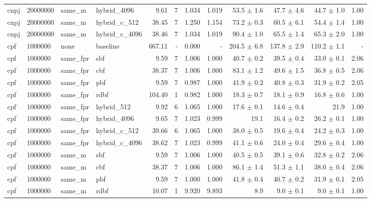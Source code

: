 \begin{tabular}{llllrrrrrrrr}
cnpj & 20000000 & same\_m & hybrid\_4096 & 9.61 & 7 & 1.034 & 1.019 & 53.5 $\pm$ 1.6 & 47.7 $\pm$ 4.6 & 44.7 $\pm$ 1.0 & 1.00 \\
cnpj & 20000000 & same\_m & hybrid\_c\_512 & 38.45 & 7 & 1.250 & 1.154 & 73.2 $\pm$ 0.3 & 60.5 $\pm$ 6.1 & 54.4 $\pm$ 1.4 & 1.00 \\
cnpj & 20000000 & same\_m & hybrid\_c\_4096 & 38.46 & 7 & 1.034 & 1.019 & 90.4 $\pm$ 1.0 & 65.5 $\pm$ 1.4 & 65.3 $\pm$ 2.0 & 1.00 \\
cpf & 1000000 & none & baseline & 667.11 & - & 0.000 & - & 204.5 $\pm$ 6.8 & 137.8 $\pm$ 2.9 & 110.2 $\pm$ 1.1 & - \\
cpf & 1000000 & same\_fpr & sbf & 9.59 & 7 & 1.006 & 1.000 & 40.7 $\pm$ 0.2 & 39.5 $\pm$ 0.4 & 33.0 $\pm$ 0.1 & 2.06 \\
cpf & 1000000 & same\_fpr & cbf & 38.37 & 7 & 1.006 & 1.000 & 83.1 $\pm$ 1.2 & 49.6 $\pm$ 1.5 & 36.8 $\pm$ 0.5 & 2.06 \\
cpf & 1000000 & same\_fpr & pbf & 9.59 & 7 & 0.987 & 1.000 & 41.9 $\pm$ 0.2 & 40.8 $\pm$ 0.3 & 31.9 $\pm$ 0.2 & 2.05 \\
cpf & 1000000 & same\_fpr & rdbf & 104.40 & 1 & 0.982 & 1.000 & 18.3 $\pm$ 0.7 & 18.1 $\pm$ 0.9 & 16.8 $\pm$ 0.6 & 1.00 \\
cpf & 1000000 & same\_fpr & hybrid\_512 & 9.92 & 6 & 1.065 & 1.000 & 17.6 $\pm$ 0.1 & 14.6 $\pm$ 0.4 & 21.9 & 1.00 \\
cpf & 1000000 & same\_fpr & hybrid\_4096 & 9.65 & 7 & 1.023 & 0.999 & 19.1 & 16.4 $\pm$ 0.2 & 26.2 $\pm$ 0.1 & 1.00 \\
cpf & 1000000 & same\_fpr & hybrid\_c\_512 & 39.66 & 6 & 1.065 & 1.000 & 38.0 $\pm$ 0.5 & 19.6 $\pm$ 0.4 & 24.2 $\pm$ 0.3 & 1.00 \\
cpf & 1000000 & same\_fpr & hybrid\_c\_4096 & 38.62 & 7 & 1.023 & 0.999 & 41.1 $\pm$ 0.6 & 24.0 $\pm$ 0.4 & 29.6 $\pm$ 0.4 & 1.00 \\
cpf & 1000000 & same\_m & sbf & 9.59 & 7 & 1.006 & 1.000 & 40.5 $\pm$ 0.5 & 39.1 $\pm$ 0.6 & 32.8 $\pm$ 0.2 & 2.06 \\
cpf & 1000000 & same\_m & cbf & 38.37 & 7 & 1.006 & 1.000 & 86.1 $\pm$ 1.4 & 51.3 $\pm$ 1.1 & 38.0 $\pm$ 0.4 & 2.06 \\
cpf & 1000000 & same\_m & pbf & 9.59 & 7 & 1.000 & 1.000 & 41.8 $\pm$ 0.4 & 40.7 $\pm$ 0.2 & 31.9 $\pm$ 0.1 & 2.05 \\
cpf & 1000000 & same\_m & rdbf & 10.07 & 1 & 9.920 & 9.893 & 8.9 & 9.0 $\pm$ 0.1 & 9.0 $\pm$ 0.1 & 1.00 \\

\end{tabular}
